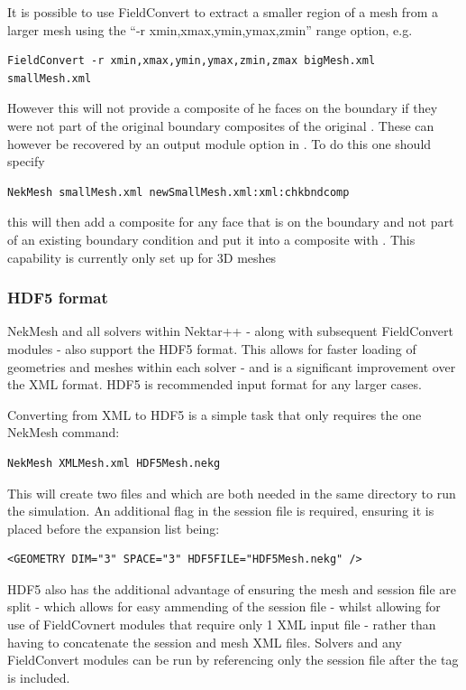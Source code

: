It is possible to use FieldConvert to extract a smaller region of a mesh
from a larger mesh using the ``-r xmin,xmax,ymin,ymax,zmin'' range
option, e.g.
\begin{lstlisting}[style=BashInputStyle]
FieldConvert -r xmin,xmax,ymin,ymax,zmin,zmax bigMesh.xml smallMesh.xml
\end{lstlisting}
However this will not provide a composite of he faces on the
boundary if they were not part of the original boundary composites of
the original . These can however be recovered by an
output module option  in \nm. To do this one should
specify
\begin{lstlisting}[style=BashInputStyle]
NekMesh smallMesh.xml newSmallMesh.xml:xml:chkbndcomp 
\end{lstlisting}
this will then add a composite for any face that is on the boundary
and not part of an existing boundary condition and put it into a
composite with . This capability is currently only set up for 3D meshes

\subsubsection{HDF5 format}

NekMesh and all solvers within Nektar++ - along with subsequent FieldConvert modules - also support the HDF5 format. This allows for faster loading of geometries and meshes within each solver - and is a significant improvement over the XML format. HDF5 is recommended input format for any larger cases.

Converting from XML to HDF5 is a simple task that only requires the one NekMesh command:
\begin{lstlisting}[style=BashInputStyle]
    NekMesh XMLMesh.xml HDF5Mesh.nekg
\end{lstlisting}

This will create two files  and  which are both needed in the same directory to run the simulation. An additional flag in the session file is required, ensuring it is placed before the expansion list being:

\begin{lstlisting}[style=XmlStyle]
    <GEOMETRY DIM="3" SPACE="3" HDF5FILE="HDF5Mesh.nekg" />
\end{lstlisting}

HDF5 also has the additional advantage of ensuring the mesh and session file are split - which allows for easy ammending of the session file - whilst allowing for use of FieldCovnert modules that require only 1 XML input file - rather than having to concatenate the session and mesh XML files. Solvers and any FieldConvert modules can be run by referencing only the session file after the  tag is included. 

